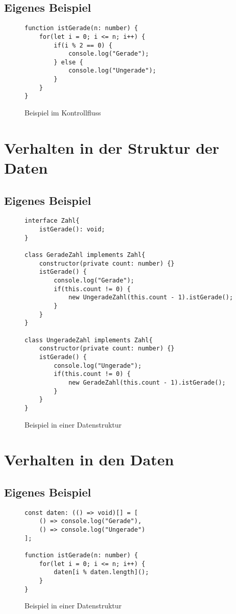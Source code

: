 \subsection{Eigenes Beispiel}
\begin{figure}[ht]
    \centering
        \begin{verbatim}
function istGerade(n: number) {
    for(let i = 0; i <= n; i++) {
        if(i % 2 == 0) {
            console.log("Gerade");
        } else {
            console.log("Ungerade");
        }
    }
}
        \end{verbatim}
    \caption{Beispiel im Kontrollfluss}
    \label{fig:KontrollflussIstGerade}
\end{figure}
\section{Verhalten in der Struktur der Daten}
\subsection{Eigenes Beispiel}
\begin{figure}[ht]
    \centering
        \begin{verbatim}
interface Zahl{
    istGerade(): void;
}

class GeradeZahl implements Zahl{
    constructor(private count: number) {}
    istGerade() {
        console.log("Gerade");
        if(this.count != 0) {
            new UngeradeZahl(this.count - 1).istGerade();
        }
    }
}

class UngeradeZahl implements Zahl{
    constructor(private count: number) {}
    istGerade() {
        console.log("Ungerade");
        if(this.count != 0) {
            new GeradeZahl(this.count - 1).istGerade();
        }
    }
}
        \end{verbatim}
    \caption{Beispiel in einer Datenstruktur}
    \label{fig:KontrollflussIstGerade}
\end{figure}

\section{Verhalten in den Daten}
\subsection{Eigenes Beispiel}
\begin{figure}[ht]
    \centering
        \begin{verbatim}
const daten: (() => void)[] = [
    () => console.log("Gerade"),
    () => console.log("Ungerade")
];

function istGerade(n: number) {
    for(let i = 0; i <= n; i++) {
        daten[i % daten.length]();
    }
}
        \end{verbatim}
    \caption{Beispiel in einer Datenstruktur}
    \label{fig:KontrollflussIstGerade}
\end{figure}